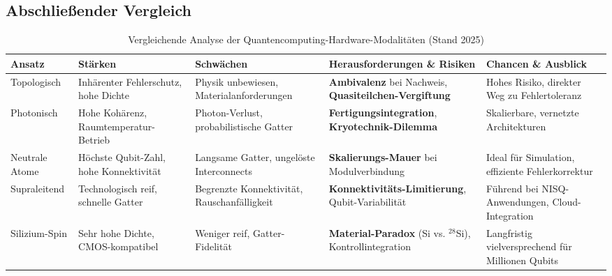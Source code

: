 \subsection{Abschließender Vergleich}
\begin{table}[ht]
\centering
\caption{Vergleichende Analyse der Quantencomputing-Hardware-Modalitäten (Stand 2025)}
\label{tab:quantum_comparison_simple}
\begin{tabular}{lllll}
\toprule
\textbf{Ansatz} & \textbf{Stärken} & \textbf{Schwächen} & \textbf{Herausforderungen \& Risiken} & \textbf{Chancen \& Ausblick} \\
\midrule

Topologisch & Inhärenter Fehlerschutz, hohe Dichte & Physik unbewiesen, Materialanforderungen & \textbf{Ambivalenz} bei Nachweis, \textbf{Quasiteilchen-Vergiftung} & Hohes Risiko, direkter Weg zu Fehlertoleranz \\
\addlinespace %

Photonisch & Hohe Kohärenz, Raumtemperatur-Betrieb & Photon-Verlust, probabilistische Gatter & \textbf{Fertigungsintegration}, \textbf{Kryotechnik-Dilemma} & Skalierbare, vernetzte Architekturen \\
\addlinespace

Neutrale Atome & Höchste Qubit-Zahl, hohe Konnektivität & Langsame Gatter, ungelöste Interconnects & \textbf{Skalierungs-Mauer} bei Modulverbindung & Ideal für Simulation, effiziente Fehlerkorrektur \\
\addlinespace

Supraleitend & Technologisch reif, schnelle Gatter & Begrenzte Konnektivität, Rauschanfälligkeit & \textbf{Konnektivitäts-Limitierung}, Qubit-Variabilität & Führend bei NISQ-Anwendungen, Cloud-Integration \\
\addlinespace

Silizium-Spin & Sehr hohe Dichte, CMOS-kompatibel & Weniger reif, Gatter-Fidelität & \textbf{Material-Paradox} (Si vs. $^{28}$Si), Kontrollintegration & Langfristig vielversprechend für Millionen Qubits \\

\bottomrule
\end{tabular}
\end{table}